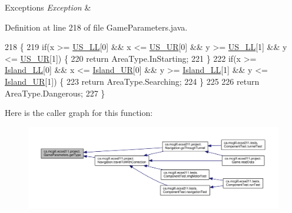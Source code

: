 \begin{DoxyExceptions}{Exceptions}
{\em Exception} & \\
\hline
\end{DoxyExceptions}


Definition at line 218 of file Game\+Parameters.\+java.


\begin{DoxyCode}
218                                               \{
219     \textcolor{keywordflow}{if}(x >= \hyperlink{enumca_1_1mcgill_1_1ecse211_1_1project_1_1_game_parameters_a4b437dfb1ca3a0898631dfd670828202}{US\_LL}[0] && x <= \hyperlink{enumca_1_1mcgill_1_1ecse211_1_1project_1_1_game_parameters_ab53ad7cced40d028fd0bbc3472cd2f8d}{US\_UR}[0] && y >= \hyperlink{enumca_1_1mcgill_1_1ecse211_1_1project_1_1_game_parameters_a4b437dfb1ca3a0898631dfd670828202}{US\_LL}[1] && y <= 
      \hyperlink{enumca_1_1mcgill_1_1ecse211_1_1project_1_1_game_parameters_ab53ad7cced40d028fd0bbc3472cd2f8d}{US\_UR}[1]) \{
220       \textcolor{keywordflow}{return} AreaType.InStarting;
221     \}
222     \textcolor{keywordflow}{if}(x >= \hyperlink{enumca_1_1mcgill_1_1ecse211_1_1project_1_1_game_parameters_a70576bc98218fc0b4a7b2d3b2d56ed2b}{Island\_LL}[0] && x <= \hyperlink{enumca_1_1mcgill_1_1ecse211_1_1project_1_1_game_parameters_ac442a5d4a39d6ffae29a183eca5934d3}{Island\_UR}[0] && y >= 
      \hyperlink{enumca_1_1mcgill_1_1ecse211_1_1project_1_1_game_parameters_a70576bc98218fc0b4a7b2d3b2d56ed2b}{Island\_LL}[1] && y <= \hyperlink{enumca_1_1mcgill_1_1ecse211_1_1project_1_1_game_parameters_ac442a5d4a39d6ffae29a183eca5934d3}{Island\_UR}[1]) \{
223       \textcolor{keywordflow}{return} AreaType.Searching;
224     \}
225     
226     \textcolor{keywordflow}{return} AreaType.Dangerous;
227   \}
\end{DoxyCode}
Here is the caller graph for this function\+:
\nopagebreak
\begin{figure}[H]
\begin{center}
\leavevmode
\includegraphics[width=350pt]{enumca_1_1mcgill_1_1ecse211_1_1project_1_1_game_parameters_a4e7713b30588fc0b2af065db0b198b2c_icgraph}
\end{center}
\end{figure}



